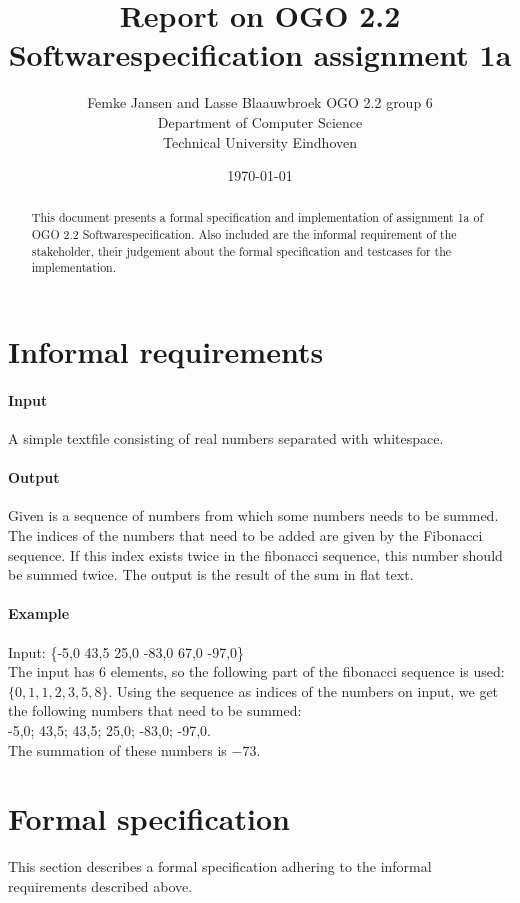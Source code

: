 \documentclass[12pt]{article}
\title{Report on OGO 2.2 Softwarespecification assignment 1a}
\author{
        Femke Jansen and Lasse Blaauwbroek OGO 2.2 group 6 \\
                Department of Computer Science\\
        Technical University Eindhoven\\
}
\date{\today}
\begin{document}
\maketitle

\begin{abstract}
This document presents a formal specification and implementation of assignment 1a of OGO 2.2 Softwarespecification. Also included are the informal requirement of the stakeholder, their judgement about the formal specification and testcases for the implementation.
\end{abstract}

\section{Informal requirements}
\paragraph{Input} A simple textfile consisting of real numbers separated with whitespace.
\paragraph{Output} Given is a sequence of numbers from which some numbers needs to be summed. The indices of the numbers that need to be added are given by the Fibonacci sequence. If this index exists twice in the fibonacci sequence, this number should be summed twice. The output is the result of the sum in flat text.
\paragraph{Example}
Input: \{-5,0 43,5 25,0 -83,0 67,0 -97,0\}\\
The input has $6$ elements, so the following part of the fibonacci sequence is used: $\{0, 1, 1, 2, 3, 5, 8\}$. Using the sequence as indices of the numbers on input, we get the following numbers that need to be summed: \\ {-5,0; 43,5; 43,5; 25,0; -83,0; -97,0}. \\ The summation of these numbers is $-73$.

\section{Formal specification}

This section describes a formal specification adhering to the informal requirements described above.
\end{document}
